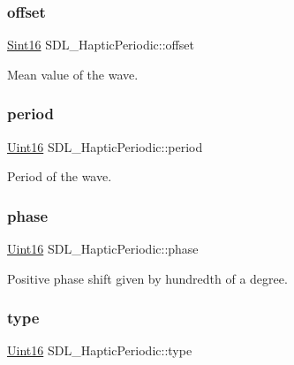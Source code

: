 \subsubsection{\texorpdfstring{offset}{offset}}
{\footnotesize\ttfamily \hyperlink{_s_d_l__stdinc_8h_a9d0257032c0e146ab6121bf0122712f5}{Sint16} S\+D\+L\+\_\+\+Haptic\+Periodic\+::offset}

Mean value of the wave. \mbox{\label{struct_s_d_l___haptic_periodic_a0e7e105b96308129b248d52b56a2a839}} 
\subsubsection{\texorpdfstring{period}{period}}
{\footnotesize\ttfamily \hyperlink{_s_d_l__stdinc_8h_a31fcc0a076c9068668173ee26d33e42b}{Uint16} S\+D\+L\+\_\+\+Haptic\+Periodic\+::period}

Period of the wave. \mbox{\label{struct_s_d_l___haptic_periodic_a25e8c6aebc78bd74b9343fa228d25d8f}} 
\subsubsection{\texorpdfstring{phase}{phase}}
{\footnotesize\ttfamily \hyperlink{_s_d_l__stdinc_8h_a31fcc0a076c9068668173ee26d33e42b}{Uint16} S\+D\+L\+\_\+\+Haptic\+Periodic\+::phase}

Positive phase shift given by hundredth of a degree. \mbox{\label{struct_s_d_l___haptic_periodic_ac53c5725e8cff012e9b90e01b7110869}} 
\subsubsection{\texorpdfstring{type}{type}}
{\footnotesize\ttfamily \hyperlink{_s_d_l__stdinc_8h_a31fcc0a076c9068668173ee26d33e42b}{Uint16} S\+D\+L\+\_\+\+Haptic\+Periodic\+::type}

